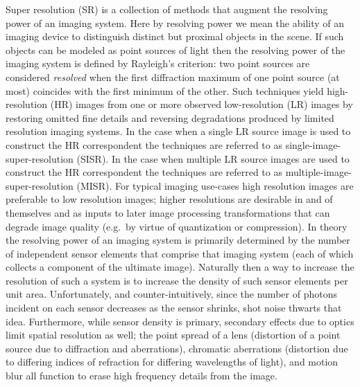 Super resolution (SR) is a collection of methods that augment the resolving power of an imaging system.
%
Here by resolving power we mean the ability of an imaging device to distinguish distinct but proximal objects in the scene.
%
If such objects can be modeled as point sources of light then the resolving power of the imaging system is defined by Rayleigh's criterion: two point sources are considered \textit{resolved} when the first diffraction maximum of one point source (at most) coincides with the first minimum of the other.
%
%
Such techniques yield high-resolution (HR) images from one or more observed low-resolution (LR) images by restoring omitted fine details and reversing degradations produced by limited resolution imaging systems.
%
In the case when a single LR source image is used to construct the HR correspondent the techniques are referred to as single-image-super-resolution (SISR).
%
In the case when multiple LR source images are used to construct the HR correspondent the techniques are referred to as multiple-image-super-resolution (MISR).
%
For typical imaging use-cases high resolution images are preferable to low resolution images; higher resolutions are
desirable in and of themselves and as inputs to later image processing transformations that can degrade image quality (e.g.\ by virtue of quantization or compression).
%
In theory the resolving power of an imaging system is primarily determined by the number of independent sensor elements that comprise that imaging system (each of which collects a component of the ultimate image).
%
Naturally then a way to increase the resolution of such a system is to increase the density of such sensor elements per unit area.
%
Unfortunately, and counter-intuitively, since the number of photons incident on each sensor decreases as the sensor shrinks, shot noise thwarts that idea.
%
Furthermore, while sensor density is primary, secondary effects due to optics limit spatial resolution as well;
the point spread of a lens (distortion of a point source due to diffraction and aberrations), chromatic aberrations (distortion due to differing indices of refraction for differing wavelengths of light), and motion blur all function to erase high frequency details from the image.

